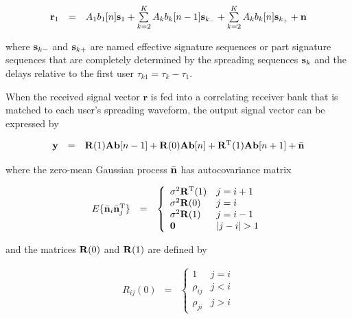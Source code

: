 \documentclass[a4paper,11pt,fleqn]{article}
\newcommand{\br}{{\mathbf r}}
\newcommand{\bA}{{\mathbf A}}
\newcommand{\bb}{{\bf b}}
\newcommand{\bs}{{\bf s}}
\newcommand{\bn}{{\bf n}}
\newcommand{\by}{{\bf y}}
\newcommand{\bR}{{\bf R}}
\begin{document}
\begin{equation}
\begin{array}{rcl}
\br_1&=&A_1b_1[n]\bs_1+\sum\limits_{k=2}^{K}A_k b_k[n-1]
\bs_{k_-}+\sum\limits_{k=2}^{K}A_k b_k[n] \bs_{k_+} + \bn
\end{array} \label{r}
\end{equation}

\noindent where $\bs_{k-}$ and $\bs_{k+}$ are named effective
signature sequences or part signature sequences that are
completely determined by the spreading sequences $\bs_k$ and the
delays relative to the first user $\tau_{k1}=\tau_k-\tau_1$.

When the received signal vector $\br$ is fed into a correlating
receiver bank that is matched to each user's spreading waveform,
the output signal vector can be expressed by

\begin{equation}
\begin{array}{rcl}
\by&=&\bR(1)\bA\bb[n-1]+\bR(0)\bA\bb[n]+\bR^{\rm
T}(1)\bA\bb[n+1]+\bar{\bn}
\end{array}
\end{equation}

\noindent where the zero-mean Gaussian process $\bar{\bn}$ has
autocovariance matrix

\begin{equation}
\begin{array}{rcl}
E\{\bar{\bn}_i\bar{\bn}_j^{\rm T}\}&=&\left\{
\begin{array}{ll}
\sigma^2\bR^{\rm T}(1)&j=i+1\\ \sigma^2\bR(0)&j=i\\
\sigma^2\bR(1)&j=i-1\\ \mathbf{0}&|j-i|>1
\end{array}\right.
\end{array}
\end{equation}

\noindent and the matrices $\bR(0)$ and $\bR(1)$ are defined by

\begin{equation}
\begin{array}{rcl}
R_{ij}(0)&=&\left\{
\begin{array}{ll}
1&j=i\\ \rho_{ij}&j<i\\ \rho_{ji}&j>i
\end{array}\right.
\end{array}
\end{equation}
\end{document}
